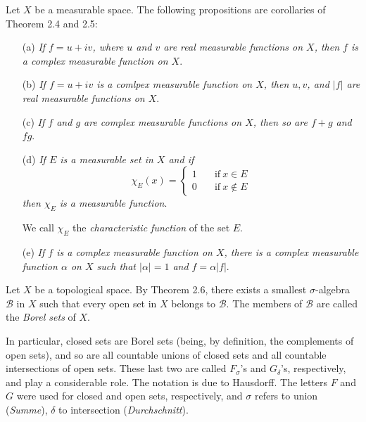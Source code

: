 \documentclass[a4paper,12pt,twoside,openany]{book}
\begin{document}
Let $X$ be a measurable space. The following propositions are corollaries of Theorem 2.4 and 2.5:
\begin{itemize}
    \item[(a)] \textit{If $f=u+iv$, where $u$ and $v$ are real measurable functions on $X$, then $f$ is a complex measurable function on $X$}.
    \item[(b)] \textit{If $f=u+iv$ is a comlpex measurable function on $X$, then $u,v$, and $|f|$ are real measurable functions on $X$}.
    \item[(c)] \textit{If $f$ and $g$ are complex measurable functions on $X$, then so are $f+g$ and $fg$}.
    \item[(d)] \textit{If $E$ is a measurable set in $X$ and if} $$\chi_E(x)=\begin{cases}1&\quad\mathrm{if~}x\in E\\0&\quad\mathrm{if~}x\notin E\end{cases}$$ \textit{then $\chi_E$ is a measurable function}.
    
    We call $\chi_E$ the \textit{characteristic function} of the set $E$.
    \item[(e)] \textit{If $f$ is a complex measurable function on $X$, there is a complex measurable function $\alpha$ on $X$ such that $|\alpha|=1$ and $f=\alpha|f|$}.
\end{itemize}


Let $X$ be a topological space. By Theorem 2.6, there exists a smallest $\sigma$-algebra $\mathscr{B}$ in $X$ such that every open set in $X$ belongs to $\mathscr{B}$. The members of $\mathscr{B}$ are called the \textit{Borel sets} of $X$.

In particular, closed sets are Borel sets (being, by definition, the complements of open sets), and so are all countable unions of closed sets and all countable intersections of open sets. These last two are called $F_{\sigma}$'s and $G_{\delta}$'s, respectively, and play a considerable role. The notation is due to Hausdorff. The letters $F$ and $G$ were used for closed and open sets, respectively, and $\sigma$ refers to union (\textit{Summe}), $\delta$ to intersection (\textit{Durchschnitt}).
\end{document}
